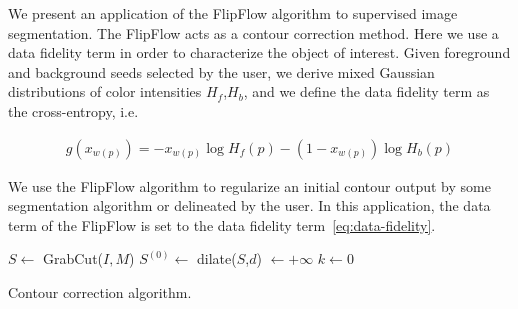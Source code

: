 {We present an application of the FlipFlow algorithm to supervised image segmentation. The FlipFlow acts as a contour correction method. Here we use a data fidelity term in order to characterize the object of interest. Given foreground and background seeds selected by the user, we derive mixed Gaussian distributions of color intensities $H_f$,$H_b$, and we define the data fidelity term as the cross-entropy, i.e.
	
\begin{align}
  g(x_{w(p)}) = -x_{w(p)}\log{H_f(p)} - (1-x_{w(p)})\log{H_b(p)}
  \label{eq:data-fidelity}
\end{align}	

We use the FlipFlow algorithm to regularize an initial contour output by some segmentation algorithm or delineated by the user. In this application, the data term of the FlipFlow
is set to the data fidelity term~\cref{eq:data-fidelity}.
	
\begin{algorithm}
 
 \BlankLine

 $S \longleftarrow$ GrabCut($I,M$)\;
 $S^{(0)} \longleftarrow $ dilate($S$,$d$)\; 
 \Delta $\longleftarrow +\infty$\;
 $k \longleftarrow 0$\;
 \caption{Contour correction algorithm.}
  \label{alg:contour-correction} 
\end{algorithm}	


}
